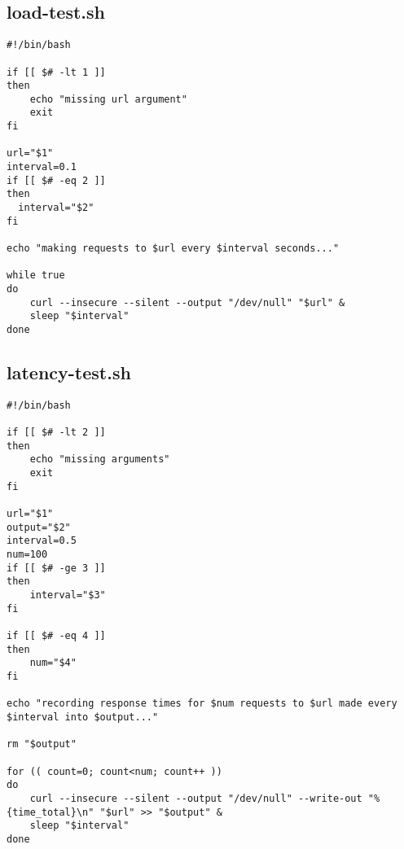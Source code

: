 \documentclass{article}
\begin{document}
\subsection{load-test.sh}
\begin{verbatim}
#!/bin/bash

if [[ $# -lt 1 ]]
then
    echo "missing url argument"
    exit
fi

url="$1"
interval=0.1
if [[ $# -eq 2 ]]
then
  interval="$2"
fi

echo "making requests to $url every $interval seconds..."

while true
do
    curl --insecure --silent --output "/dev/null" "$url" &
    sleep "$interval"
done
\end{verbatim}

\subsection{latency-test.sh}
\begin{verbatim}
#!/bin/bash

if [[ $# -lt 2 ]]
then
    echo "missing arguments"
    exit
fi

url="$1"
output="$2"
interval=0.5
num=100
if [[ $# -ge 3 ]]
then
    interval="$3"
fi

if [[ $# -eq 4 ]]
then
    num="$4"
fi

echo "recording response times for $num requests to $url made every $interval into $output..."

rm "$output"

for (( count=0; count<num; count++ ))
do
    curl --insecure --silent --output "/dev/null" --write-out "%{time_total}\n" "$url" >> "$output" &
    sleep "$interval"
done

\end{verbatim}
\end{document}

